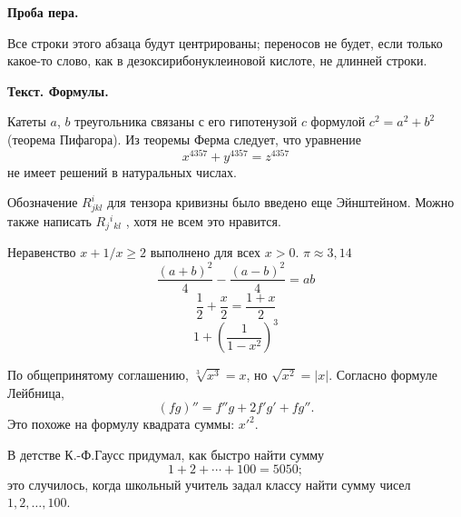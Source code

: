 \documentclass[12pt]{article}
\newcommand{\nl}{\vspace{\baselineskip}} %
\begin{document}
{\bf Проба пера.}

\begin{center}
Все строки этого абзаца будут
центрированы; переносов не будет,
если только какое-то слово,
как в дезоксирибонуклеиновой
кислоте, не длинней строки.
\end{center}

{\bf Текст. Формулы.}\nl

Катеты $a$, $b$ треугольника связаны с его гипотенузой $c$ формулой ${c^2=a^2+b^2}$ (теорема Пифагора).
Из теоремы Ферма следует, что уравнение $$x^{4357}+y^{4357} = z^{4357}$$ не имеет решений в натуральных числах.\nl

Обозначение $R^i_{jkl}$ для тензора кривизны было введено еще Эйнштейном.
Можно также написать $R_j{}^i{}_{kl}$ , хотя не всем это нравится.\nl

Неравенство $x+1/x\ge2$ выполнено для всех $x>0$.
$\pi\approx3{,}14$
$$\frac{(a+b)^2}{4}-\frac{(a-b)^2}{4}=ab$$
$$\frac 12 +\frac x 2 = \frac{1+x}2$$
$$1+\left(\frac1{1-x^2}\right)^3$$\nl

По общепринятому соглашению, $\sqrt[3]{x^3}=x$, но $\sqrt{x^2}=|x|$.
Согласно формуле Лейбница, $$(fg)''= f''g + 2f'g' + fg'' .$$ Это похоже на формулу квадрата суммы: ${x'}^2$.\nl

В детстве К.-Ф.Гаусс придумал, как быстро найти сумму $$1+2+\cdots+100=5050;$$ это случилось, когда школьный учитель задал классу найти сумму чисел $1,2,\ldots,100$.
\end{document}
